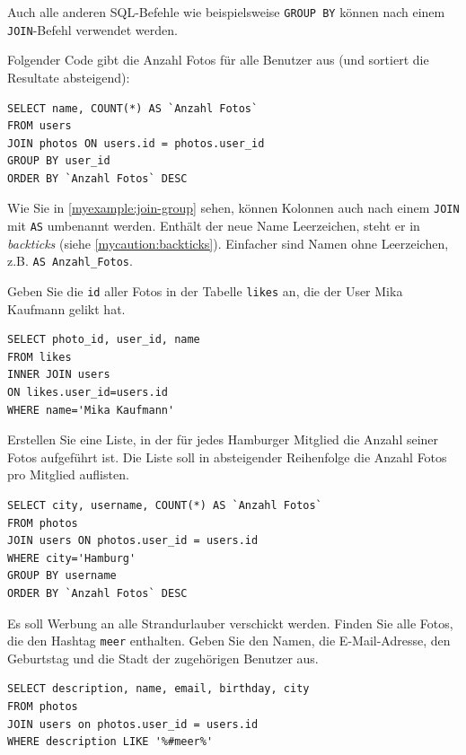 Auch alle anderen SQL-Befehle wie beispielsweise \lstinline|GROUP BY| können nach einem \lstinline|JOIN|-Befehl verwendet werden.

\begin{myexample}\label{myexample:join-group}
Folgender Code gibt die Anzahl Fotos für alle Benutzer aus (und sortiert die Resultate absteigend):
\begin{lstlisting}
SELECT name, COUNT(*) AS `Anzahl Fotos`
FROM users
JOIN photos ON users.id = photos.user_id
GROUP BY user_id
ORDER BY `Anzahl Fotos` DESC
\end{lstlisting}
\end{myexample}

\begin{mycaution}
  Wie Sie in \cref{myexample:join-group} sehen, können Kolonnen auch nach einem \lstinline|JOIN| mit \lstinline|AS| umbenannt werden. Enthält der neue Name Leerzeichen, steht er in \textit{backticks} (siehe \cref{mycaution:backticks}). Einfacher sind Namen ohne Leerzeichen, z.B. \lstinline|AS Anzahl_Fotos|.
\end{mycaution}

\begin{myexercise}
  Geben Sie die \texttt{id} aller Fotos in der Tabelle \texttt{likes} an, die der User Mika Kaufmann gelikt hat.
  \begin{myanswer}
    \begin{lstlisting}
SELECT photo_id, user_id, name
FROM likes
INNER JOIN users
ON likes.user_id=users.id
WHERE name='Mika Kaufmann'
\end{lstlisting}
  \end{myanswer}
\end{myexercise}
\begin{mychallenge}
  Erstellen Sie eine Liste, in der für jedes Hamburger Mitglied die Anzahl seiner Fotos aufgeführt ist. Die Liste soll in absteigender Reihenfolge die Anzahl Fotos pro Mitglied auflisten.
  \begin{myanswer}
    \begin{lstlisting}
SELECT city, username, COUNT(*) AS `Anzahl Fotos`
FROM photos
JOIN users ON photos.user_id = users.id
WHERE city='Hamburg'
GROUP BY username
ORDER BY `Anzahl Fotos` DESC
\end{lstlisting}
  \end{myanswer}
\end{mychallenge}

\begin{myexercise}
  Es soll Werbung an alle Strandurlauber verschickt werden. Finden Sie alle Fotos, die den Hashtag \texttt{meer} enthalten. Geben Sie den Namen, die E-Mail-Adresse, den Geburtstag und die Stadt der zugehörigen Benutzer aus.
  \begin{myanswer}
    \begin{lstlisting}
SELECT description, name, email, birthday, city
FROM photos
JOIN users on photos.user_id = users.id
WHERE description LIKE '%#meer%'
\end{lstlisting}
  \end{myanswer}
\end{myexercise}

